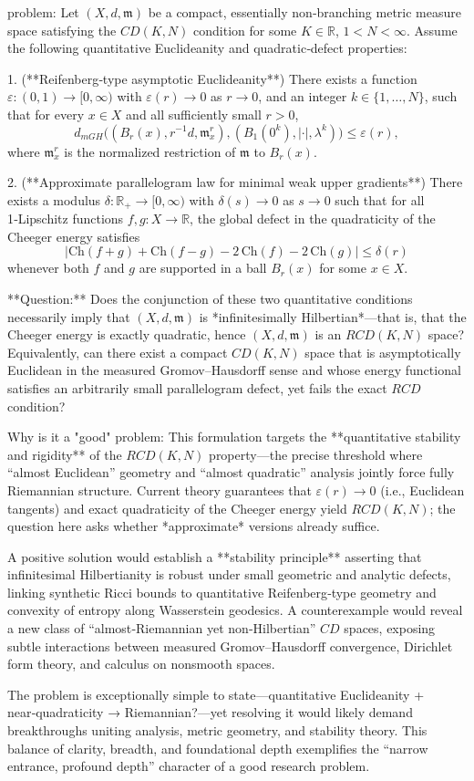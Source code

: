 problem:  
Let \((X,d,\mathfrak{m})\) be a compact, essentially non‑branching metric measure space satisfying the \(CD(K,N)\) condition for some \(K\in\mathbb{R}\), \(1<N<\infty\).  
Assume the following quantitative Euclideanity and quadratic‑defect properties:

1. (**Reifenberg‑type asymptotic Euclideanity**)  
   There exists a function \(\varepsilon:(0,1)\to[0,\infty)\) with \(\varepsilon(r)\to 0\) as \(r\to0\), and an integer \(k\in\{1,\dots,N\}\), such that for every \(x\in X\) and all sufficiently small \(r>0\),
   \[
   d_{mGH}\big((B_r(x),r^{-1}d,\mathfrak{m}_x^r), (B_1(0^k),|\cdot|,\lambda^k)\big)\le \varepsilon(r),
   \]
   where \(\mathfrak{m}_x^r\) is the normalized restriction of \(\mathfrak{m}\) to \(B_r(x)\).

2. (**Approximate parallelogram law for minimal weak upper gradients**)  
   There exists a modulus \(\delta:\mathbb{R}_+\to[0,\infty)\) with \(\delta(s)\to0\) as \(s\to0\) such that for all 1‑Lipschitz functions \(f,g:X\to\mathbb{R}\), the global defect in the quadraticity of the Cheeger energy satisfies  
   \[
   \left|\mathrm{Ch}(f+g)+\mathrm{Ch}(f-g)-2\,\mathrm{Ch}(f)-2\,\mathrm{Ch}(g)\right|\le \delta(r)
   \]
   whenever both \(f\) and \(g\) are supported in a ball \(B_r(x)\) for some \(x\in X\).

**Question:**  
Does the conjunction of these two quantitative conditions necessarily imply that \((X,d,\mathfrak{m})\) is *infinitesimally Hilbertian*—that is, that the Cheeger energy is exactly quadratic, hence \((X,d,\mathfrak{m})\) is an \(RCD(K,N)\) space?  
Equivalently, can there exist a compact \(CD(K,N)\) space that is asymptotically Euclidean in the measured Gromov–Hausdorff sense and whose energy functional satisfies an arbitrarily small parallelogram defect, yet fails the exact \(RCD\) condition?

Why is it a "good" problem:  
This formulation targets the **quantitative stability and rigidity** of the \(RCD(K,N)\) property—the precise threshold where “almost Euclidean” geometry and “almost quadratic” analysis jointly force fully Riemannian structure.  
Current theory guarantees that \(\varepsilon(r)\to0\) (i.e., Euclidean tangents) and exact quadraticity of the Cheeger energy yield \(RCD(K,N)\); the question here asks whether *approximate* versions already suffice.  

A positive solution would establish a **stability principle** asserting that infinitesimal Hilbertianity is robust under small geometric and analytic defects, linking synthetic Ricci bounds to quantitative Reifenberg‑type geometry and convexity of entropy along Wasserstein geodesics.  
A counterexample would reveal a new class of “almost‑Riemannian yet non‑Hilbertian” \(CD\) spaces, exposing subtle interactions between measured Gromov–Hausdorff convergence, Dirichlet form theory, and calculus on nonsmooth spaces.  

The problem is exceptionally simple to state—quantitative Euclideanity + near‑quadraticity → Riemannian?—yet resolving it would likely demand breakthroughs uniting analysis, metric geometry, and stability theory. This balance of clarity, breadth, and foundational depth exemplifies the “narrow entrance, profound depth” character of a good research problem.